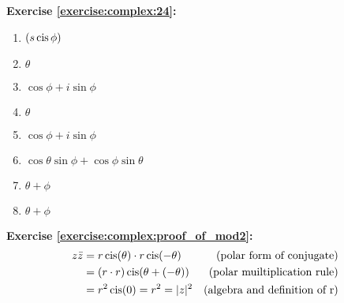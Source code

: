 \noindent\textbf{Exercise \ref{exercise:complex:24}:} %
\begin{multicols}{2}
\begin{enumerate}
\item
$(s\operatorname{cis}\phi)$

\item
$\theta$

\item
$\cos\phi+i\sin\phi$
 
\item
$\theta$

\item
$\cos\phi+i\sin\phi$

\item
$\cos\theta \sin\phi + \cos\phi \sin\theta$

\item
$\theta+\phi$

\item
$\theta+\phi$
\end{enumerate}
\end{multicols}

\noindent\textbf{Exercise \ref{exercise:complex:proof_of_mod2}:} 
\begin{align}
z \bar{z} &= r \operatorname{cis} (\theta) \cdot r \operatorname{cis} (-\theta) & (\textrm{polar form of conjugate}) \\
 &= (r \cdot r) \operatorname{cis}(\theta + (-\theta))  & (\textrm{polar muiltiplication rule}) \\
 &= r^2 \operatorname{cis}(0) = r^2 = |z|^2  & (\textrm{algebra and definition of r})
 \end{align}

